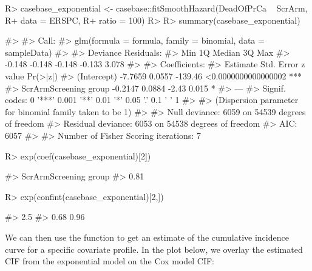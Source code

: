 \documentclass[
]{jss}
\begin{document}
\begin{CodeChunk}

\begin{CodeInput}
R> casebase_exponential <- casebase::fitSmoothHazard(DeadOfPrCa ~ ScrArm, 
R+                                                   data = ERSPC, 
R+                                                   ratio = 100)
R> 
R> summary(casebase_exponential)
\end{CodeInput}

\begin{CodeOutput}
#> 
#> Call:
#> glm(formula = formula, family = binomial, data = sampleData)
#> 
#> Deviance Residuals: 
#>    Min      1Q  Median      3Q     Max  
#> -0.148  -0.148  -0.148  -0.133   3.078  
#> 
#> Coefficients:
#>                       Estimate Std. Error z value            Pr(>|z|)    
#> (Intercept)            -7.7659     0.0557 -139.46 <0.0000000000000002 ***
#> ScrArmScreening group  -0.2147     0.0884   -2.43               0.015 *  
#> ---
#> Signif. codes:  0 '***' 0.001 '**' 0.01 '*' 0.05 '.' 0.1 ' ' 1
#> 
#> (Dispersion parameter for binomial family taken to be 1)
#> 
#>     Null deviance: 6059  on 54539  degrees of freedom
#> Residual deviance: 6053  on 54538  degrees of freedom
#> AIC: 6057
#> 
#> Number of Fisher Scoring iterations: 7
\end{CodeOutput}

\begin{CodeInput}
R> exp(coef(casebase_exponential)[2])
\end{CodeInput}

\begin{CodeOutput}
#> ScrArmScreening group 
#>                  0.81
\end{CodeOutput}

\begin{CodeInput}
R> exp(confint(casebase_exponential)[2,])
\end{CodeInput}

\begin{CodeOutput}
#>  2.5 %
#>   0.68   0.96
\end{CodeOutput}
\end{CodeChunk}

We can then use the  function to get an estimate of
the cumulative incidence curve for a specific covariate profile. In the
plot below, we overlay the estimated CIF from the exponential model on
the Cox model CIF:
\end{document}
